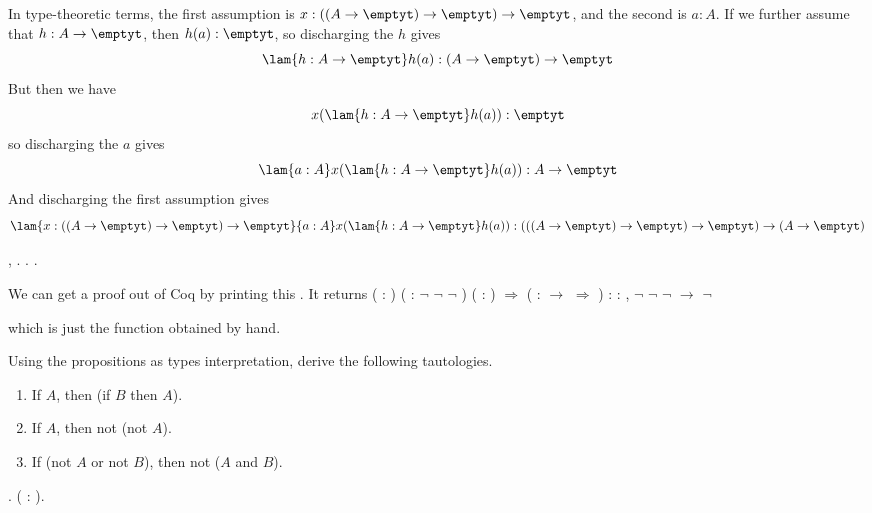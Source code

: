 In type-theoretic terms, the first assumption is $x : ((A \to \emptyt) \to
\emptyt) \to \emptyt$, and the second is $a : A$.  If we further assume that
$h : A \to \emptyt$, then $h(a) : \emptyt$, so discharging the $h$ gives
\[
\lam{h:A \to \emptyt}h(a) : (A \to \emptyt) \to \emptyt
\]
But then we have
\[
x(\lam{h : A \to \emptyt}h(a)) : \emptyt
\]
so discharging the $a$ gives
\[
\lam{a:A}x(\lam{h : A \to \emptyt}h(a)) : A \to \emptyt
\]
And discharging the first assumption gives
\[
\lam{x:((A\to\emptyt)\to\emptyt)\to\emptyt}{a:A}x(\lam{h : A \to
\emptyt}h(a)) :
(((A \to \emptyt) \to \emptyt) \to \emptyt) \to (A \to \emptyt)
\] \begin{coqdoccode}
\coqdocemptyline
\coqdocnoindent
{} \coqdockw{\ensuremath{\forall}} , \coqdocnotation{\ensuremath{\lnot}} \coqdocnotation{\ensuremath{\lnot}} \coqdocnotation{\ensuremath{\lnot}}   \coqdocnotation{\ensuremath{\lnot}}. . .\coqdoceol
\coqdocemptyline
\end{coqdoccode}


\noindent 
We can get a proof out of Coq by printing this .  It returns
    \coqdoceol
\coqdocemptyline
\coqdocindent{2.00em}
 ( : ) ( : \ensuremath{\lnot} \ensuremath{\lnot} \ensuremath{\lnot} ) ( : ) \ensuremath{\Rightarrow}  (  :  \ensuremath{\rightarrow}  \ensuremath{\Rightarrow}  ) \coqdoceol
\coqdocindent{2.00em}
: \coqdockw{\ensuremath{\forall}}  : , \ensuremath{\lnot} \ensuremath{\lnot} \ensuremath{\lnot}  \ensuremath{\rightarrow} \ensuremath{\lnot} 

\coqdocemptyline
    \noindent
    which is just the function obtained by hand. 

    Using the propositions as types interpretation, derive the
    following tautologies.
\begin{enumerate}
\item If $A$, then (if $B$ then $A$).
\item If $A$, then not (not $A$).
\item If (not $A$ or not $B$), then not ($A$ and $B$).
\end{enumerate} \begin{coqdoccode}
\coqdocemptyline
\coqdocnoindent
{} .\coqdoceol
\coqdocindent{1.00em}
 (  : ).\coqdoceol
\coqdocemptyline
\end{coqdoccode}


